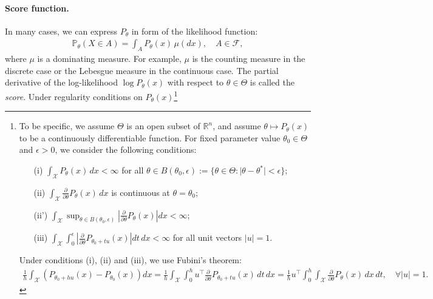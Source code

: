 \documentclass{article}
\numberwithin{equation}{section}
\newcommand{\bbP}{\mathbb{P}}
\newcommand{\bbR}{\mathbb{R}}
\renewcommand{\cal}{\mathcal}
\theoremstyle{plain}
\theoremstyle{definition}
\begin{document}
\paragraph{Score function.} In many cases, we can express $P_\theta$ in form of the likelihood function:
\begin{align*}
	\bbP_\theta(X\in A)=\int_A P_\theta(x)\,\mu(dx),\quad A\in\mathscr{F},
\end{align*}
where $\mu$ is a dominating measure. For example, $\mu$ is the counting measure in the discrete case or the Lebesgue measure in the continuous case. The partial derivative of the log-likelihood $\log P_\theta(x)$ with respect to $\theta\in\Theta$ is called the \textit{score}. Under regularity conditions on $P_\theta(x)$\footnote{
To be specific, we assume $\Theta$ is an open subset of $\bbR^n$, and assume $\theta\mapsto P_\theta(x)$ to be a continuously differentiable function. For fixed parameter value $\theta_0\in\Theta$ and $\epsilon>0$, we consider the following conditions:
\begin{itemize}
\item[(i)] $\displaystyle\int_\cal{X} P_\theta(x)\,dx<\infty$ for all $\theta\in B(\theta_0,\epsilon):=\{\theta\in\Theta:\vert\theta-\theta^*\vert<\epsilon\}$;\vspace{0.07cm}
\item[(ii)] $\displaystyle\int_\cal{X}\frac{\partial}{\partial\theta}P_\theta(x)\,dx$ is continuous at $\theta=\theta_0$;\vspace{0.07cm}
\item[(ii')] $\displaystyle\int_\cal{X}\sup_{\theta\in B(\theta_0,\epsilon)}\left\vert\frac{\partial}{\partial\theta}P_\theta(x)\right\vert dx<\infty$;\vspace{0.07cm}
\item[(iii)] $\displaystyle\int_\cal{X}\int_{0}^{\epsilon}\left\vert\frac{\partial}{\partial\theta}P_{\theta_0+tu}(x)\right\vert dt\,dx<\infty$ for all unit vectors $\vert u\vert =1$.\vspace{0.07cm}
\end{itemize}
Under conditions (i), (ii) and (iii), we use Fubini's theorem:
\begin{align*}
	\frac{1}{h}\int_{\cal{X}}\left(P_{\theta_0+hu}(x)-P_{\theta_0}(x)\right)dx=\frac{1}{h}\int_\cal{X}\int_{0}^{h}u^\top\frac{\partial}{\partial\theta} P_{\theta_0+tu}(x)\, dt\,dx=\frac{1}{h}u^\top\int_{0}^{h}\int_\cal{X}\frac{\partial}{\partial\theta}P_\theta(x)\,dx\, dt,\quad\forall\vert u\vert=1.
\end{align*}
}
\end{document}
